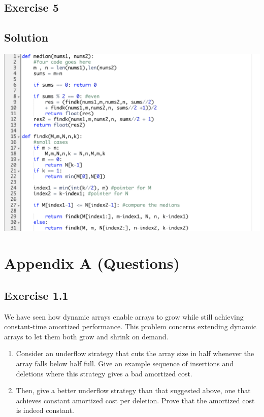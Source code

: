\documentclass[10pt,a4paper]{article}
\begin{document}
\subsection*{Exercise 5}
\subsection*{Solution}
\begin{center}
\includegraphics[width=\textwidth]{median}
\end{center}
\break

\break
\section*{Appendix A (Questions)}
\subsection*{Exercise 1.1}
We have seen how dynamic arrays enable arrays to grow while still achieving constant-time amortized performance. This problem concerns extending dynamic arrays to let them both grow and shrink on demand.
\begin{enumerate}
\item Consider an underflow strategy that cuts the array size in half whenever the array falls below half full. Give an example sequence of insertions and deletions where this strategy gives a bad amortized cost.
\item 
Then, give a better underflow strategy than that suggested above, one that achieves constant amortized cost per deletion. Prove that the amortized cost is indeed constant.
\end{enumerate}
\end{document}
